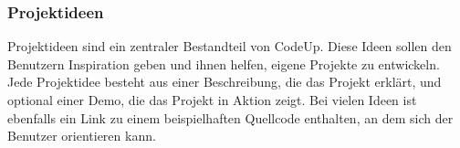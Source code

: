 \documentclass[main.tex]{subfiles}
\begin{document}
    \subsubsection{Projektideen}
    Projektideen sind ein zentraler Bestandteil von CodeUp.
    Diese Ideen sollen den Benutzern Inspiration geben und ihnen helfen, eigene Projekte zu entwickeln.
    Jede Projektidee besteht aus einer Beschreibung, die das Projekt erklärt, und optional einer Demo, die das Projekt in Aktion zeigt.
    Bei vielen Ideen ist ebenfalls ein Link zu einem beispielhaften Quellcode enthalten, an dem sich der Benutzer orientieren kann.
\end{document}
